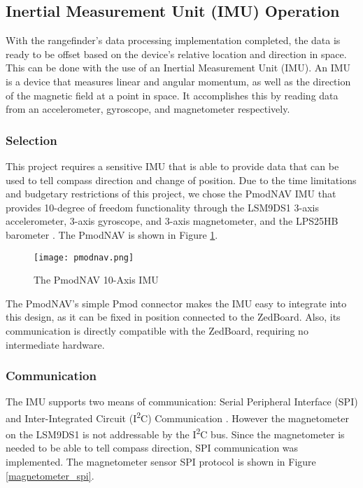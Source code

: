 \subsection{Inertial Measurement Unit (IMU) Operation}
With the rangefinder's data processing implementation completed, the data is ready to be offset based on the device's relative location and direction in space. This can be done with the use of an Inertial Measurement Unit (IMU). An IMU is a device that measures linear and angular momentum, as well as the direction of the magnetic field at a point in space. It accomplishes this by reading data from an accelerometer, gyroscope, and magnetometer respectively. 

\subsubsection{Selection}
This project requires a sensitive IMU that is able to provide data that can be used to tell compass direction and change of position. Due to the time limitations and budgetary restrictions of this project, we chose the PmodNAV IMU that provides 10-degree of freedom functionality through the LSM9DS1 3-axis accelerometer, 3-axis gyroscope, and 3-axis magnetometer, and the LPS25HB barometer \cite{lsm9ds1, lps25hd}. The PmodNAV is shown in Figure \ref{pmodnav}.

\begin{figure}[H]
	\centerline{\texttt{[image: pmodnav.png]}}
	\caption{The PmodNAV 10-Axis IMU \cite{pmodnav_ref}}
	\label{pmodnav}
\end{figure}

The PmodNAV's simple Pmod connector makes the IMU easy to integrate into this design, as it can be fixed in position connected to the ZedBoard. Also, its communication is directly compatible with the ZedBoard, requiring no intermediate hardware.

\subsubsection{Communication}
The IMU supports two means of communication: Serial Peripheral Interface (SPI) and Inter-Integrated Circuit (I\textsuperscript{2}C) Communication \cite{lsm9ds1}. However the magnetometer on the LSM9DS1 is not addressable by the I\textsuperscript{2}C bus. Since the magnetometer is needed to be able to tell compass direction, SPI communication was implemented. The magnetometer sensor SPI protocol is shown in Figure \ref{magnetometer_spi}.

